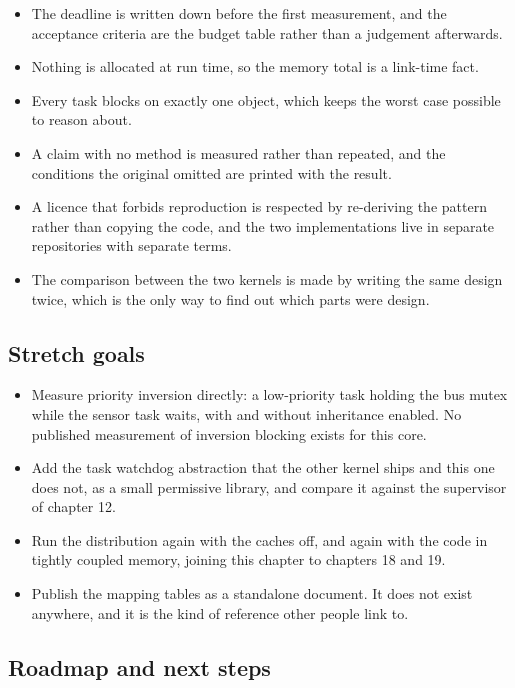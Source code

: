 \begin{itemize}
\item The deadline is written down before the first measurement, and the
acceptance criteria are the budget table rather than a judgement afterwards.
\item Nothing is allocated at run time, so the memory total is a link-time
fact.
\item Every task blocks on exactly one object, which keeps the worst case
possible to reason about.
\item A claim with no method is measured rather than repeated, and the
conditions the original omitted are printed with the result.
\item A licence that forbids reproduction is respected by re-deriving the
pattern rather than copying the code, and the two implementations live in
separate repositories with separate terms.
\item The comparison between the two kernels is made by writing the same design
twice, which is the only way to find out which parts were design.
\end{itemize}

\subsection*{Stretch goals}

\begin{itemize}
\item Measure priority inversion directly: a low-priority task holding the bus
mutex while the sensor task waits, with and without inheritance enabled. No
published measurement of inversion blocking exists for this core.
\item Add the task watchdog abstraction that the other kernel ships and this
one does not, as a small permissive library, and compare it against the
supervisor of chapter 12.
\item Run the distribution again with the caches off, and again with the code
in tightly coupled memory, joining this chapter to chapters 18 and 19.
\item Publish the mapping tables as a standalone document. It does not exist
anywhere, and it is the kind of reference other people link to.
\end{itemize}

\subsection*{Roadmap and next steps}

